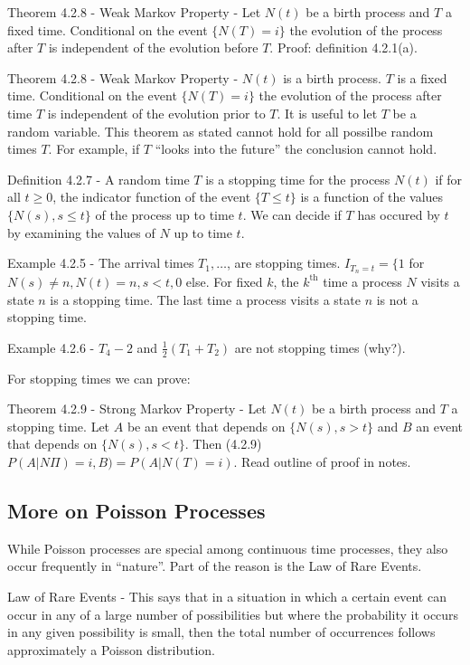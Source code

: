 \documentclass{article}
\begin{document}
Theorem 4.2.8 - Weak Markov Property - Let $N(t)$ be a birth process and $T$ a fixed time. Conditional on the event $\{N(T) = i\}$ the evolution of the process after $T$ is independent of the evolution before $T$. Proof: definition 4.2.1(a).

Theorem 4.2.8 - Weak Markov Property - $N(t)$ is a birth process. $T$ is a fixed time. Conditional on the event $\{N(T)=i\}$ the evolution of the process  after time $T$ is independent of the evolution prior to $T$. It is useful to let $T$ be a random variable. This theorem as stated cannot hold for all possilbe random times $T$. For example, if $T$ ``looks into the future'' the conclusion cannot hold.

Definition 4.2.7 - A random time $T$ is a stopping time for the process $N(t)$ if for all $t \ge 0$, the indicator function of the event $\{T \le t\}$ is a function of the values $\{N(s), s \le t\}$ of the process up to time $t$. We can decide if $T$ has occured by $t$ by examining the values of $N$ up to time $t$.

Example 4.2.5 - The arrival times $T_1, \dots$, are stopping times. $I_{T_n = t} = \{1$ for $N(s) \ne n, N(t) = n, s < t, 0$ else. For fixed $k$, the $k^\textrm{th}$ time a process $N$ visits a state $n$ is a stopping time. The last time a process visits a state $n$ is not a stopping time.

Example 4.2.6 - $T_4 - 2$ and $\frac{1}{2} (T_1 + T_2)$ are not stopping times (why?).

For stopping times we can prove:

Theorem 4.2.9 - Strong Markov Property - Let $N(t)$ be a birth process and $T$ a stopping time. Let $A$ be an event that depends on $\{N(s), s > t\}$ and $B$ an event that depends on $\{N(s), s < t\}$. Then (4.2.9) $P(A|N \Pi) = i, B) = P(A|N(T) = i)$. Read outline of proof in notes.

\subsection{More on Poisson Processes}

While Poisson processes are special among continuous time processes, they also occur frequently in ``nature''. Part of the reason is the Law of Rare Events.

Law of Rare Events - This says that in a situation in which a certain event can occur in any of a large number of possibilities but where the probability it occurs in any given possibility is small, then the total number of occurrences follows approximately a Poisson distribution.
\end{document}
